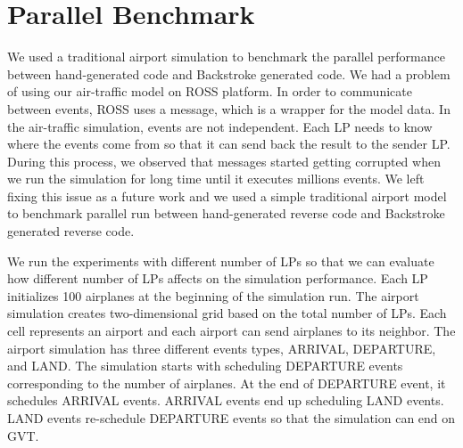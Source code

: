 \section{Parallel Benchmark}

We used a traditional airport simulation \cite{fujpar} to benchmark the parallel performance between hand-generated code and Backstroke generated code. 
We had a problem of using our air-traffic model on ROSS platform. 
In order to communicate between events, ROSS uses a message, which is a wrapper for the model data.
In the air-traffic simulation, events are not independent.
Each LP needs to know where the events come from so that it can send back the result to the sender LP. 
During this process, we observed that messages started getting corrupted when we run the simulation for long time until it executes millions events.
We left fixing this issue as a future work and we used a simple traditional airport model to benchmark parallel run between hand-generated reverse code and Backstroke generated reverse code.

We run the experiments with different number of LPs so that we can evaluate how different number of LPs affects on the simulation performance.
Each LP initializes 100 airplanes at the beginning of the simulation run.
The airport simulation creates two-dimensional grid based on the total number of LPs.
Each cell represents an airport and each airport can send airplanes to its neighbor.
The airport simulation has three different events types, ARRIVAL, DEPARTURE, and LAND.
The simulation starts with scheduling DEPARTURE events corresponding to the number of airplanes. 
At the end of DEPARTURE event, it schedules ARRIVAL events. ARRIVAL events end up scheduling LAND events.
LAND events re-schedule DEPARTURE events so that the simulation can end on GVT.

